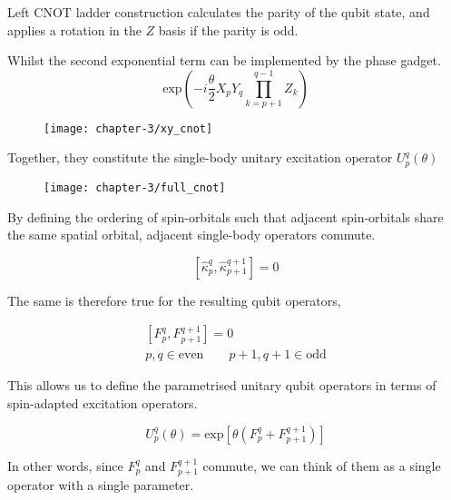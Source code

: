 Left CNOT ladder construction calculates the parity of the qubit state, and applies a rotation in the $Z$ basis if the parity is odd.

Whilst the second exponential term can be implemented by the phase gadget.
\begin{equation*}
    \text{exp} \left( - i
    \frac{\theta}{2} X_p Y_q \prod_{k=p+1}^{q-1} Z_k \right)
\end{equation*}

\begin{figure}[H]
\centering
    \texttt{[image: chapter-3/xy\_cnot]}
\end{figure}


Together, they constitute the single-body unitary excitation operator $U^q_p (\theta)$

\begin{figure}[H]
\centering
    \texttt{[image: chapter-3/full\_cnot]}
\end{figure}

By defining the ordering of spin-orbitals such that adjacent spin-orbitals share the same spatial orbital, adjacent single-body operators commute.

\begin{equation*}
    \left[ \hat\kappa_p^q, \hat\kappa_{p+1}^{q+1} \right] = 0
\end{equation*}\smallskip

The same is therefore true for the resulting qubit operators,

\begin{equation*}
\begin{gathered}
    \left[ F_p^q, F_{p+1}^{q+1} \right] = 0 \\
    p, q \in \text{even} \qquad p+1, q+1 \in \text{odd}
\end{gathered}
\end{equation*}

This allows us to define the parametrised unitary qubit operators in terms of spin-adapted excitation operators.

\begin{equation*}
    U^q_p (\theta) = \text{exp}
    \left[ \theta \left( F_p^q + F_{p+1}^{q+1} \right) \right]
\end{equation*}

In other words, since $F_p^q$ and $F_{p+1}^{q+1}$ commute, we can think of them as a single operator with a single parameter.




